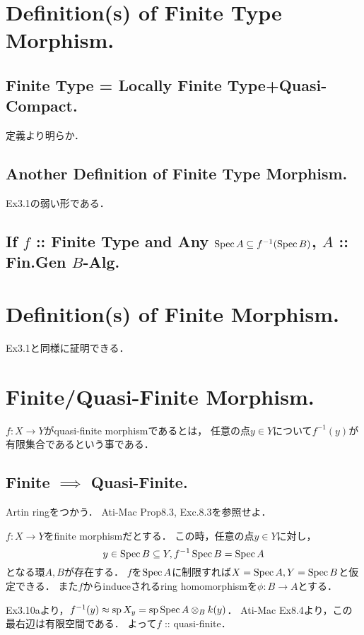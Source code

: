 \documentclass[a4paper]{jsarticle}
\begin{document}
\section{Definition(s) of Finite Type Morphism.} %
    \subsection{Finite Type = Locally Finite Type+Quasi-Compact.}
    定義より明らか．

    \subsection{Another Definition of Finite Type Morphism.}
    Ex3.1の弱い形である．

    \subsection{If $f$ :: Finite Type and Any $\operatorname{Spec} A \subseteq f^{-1}(\operatorname{Spec} B)$, $A$ :: Fin.Gen $B$-Alg.}

\section{Definition(s) of Finite Morphism.} %
    Ex3.1と同様に証明できる．

\section{Finite/Quasi-Finite Morphism.} %
    $f: X \to Y$がquasi-finite morphismであるとは，
    任意の点$y \in Y$について$f^{-1}(y)$が有限集合であるという事である．

    \subsection{Finite $\implies$ Quasi-Finite.}
    Artin ringをつかう．
    Ati-Mac Prop8.3, Exc.8.3を参照せよ．
    
    $f: X \to Y$をfinite morphismだとする．
    この時，任意の点$y \in Y$に対し，
    \[ y \in \operatorname{Spec} B \subseteq Y, f^{-1}\operatorname{Spec} B=\operatorname{Spec} A \]
    となる環$A,B$が存在する．
    $f$を$\operatorname{Spec} A$に制限すれば$X=\operatorname{Spec} A, Y=\operatorname{Spec} B$と仮定できる．
    また$f$からinduceされるring homomorphismを$\phi: B \to A$とする．
    
    Ex3.10aより，$f^{-1}(y) \approx \operatorname{sp} X_y=\operatorname{sp} \operatorname{Spec} A \otimes_B k(y)$．
    Ati-Mac Ex8.4より，この最右辺は有限空間である．
    よって$f$ :: quasi-finite．
\end{document}

